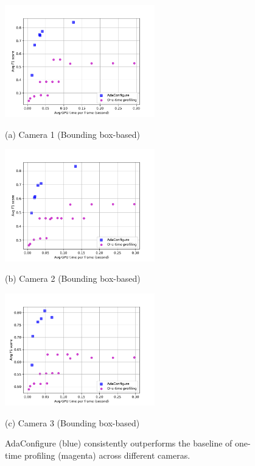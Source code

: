 \begin{figure}[!t]
	\begin{minipage}[t]{0.32\linewidth}
		\centerline{\includegraphics[width=6.5cm]{figures/Westbound.pdf}}
		\centerline{(a) Camera 1 (Bounding box-based)}
	\end{minipage}
	\hfill
	\begin{minipage}[t]{0.32\linewidth}
		\centerline{\includegraphics[width=6.5cm]{figures/Eastbound.pdf}}
		\centerline{(b) Camera 2 (Bounding box-based)}
	\end{minipage}
	\hfill
	\begin{minipage}[t]{0.32\linewidth}
		\centerline{\includegraphics[width=6.5cm]{figures/Rear.pdf}}
		\centerline{(c) Camera 3 (Bounding box-based)}
	\end{minipage}		
	\caption{AdaConfigure (blue) consistently outperforms the baseline of one-time profiling (magenta) across different cameras.}
	\label{fig: 3dataset results}
\end{figure}

